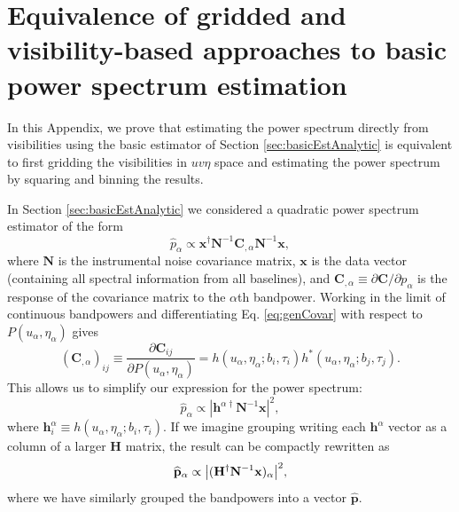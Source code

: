 \documentclass[twocolumn,aps,prd,nofootinbib,showpacs]{revtex4-1}
\begin{document}
\section{Equivalence of gridded and visibility-based approaches to basic power spectrum estimation}
\label{appendix:GridVsVisEquiv}

In this Appendix, we prove that estimating the power spectrum directly from visibilities using the basic estimator of Section \ref{sec:basicEstAnalytic} is equivalent to first gridding the visibilities in $uv\eta$ space and estimating the power spectrum by squaring and binning the results.

In Section \ref{sec:basicEstAnalytic} we considered a quadratic power spectrum estimator of the form
\begin{equation}
\widehat{p}_\alpha \propto \mathbf{x}^\dagger \mathbf{N}^{-1} \mathbf{C}_{,\alpha} \mathbf{N}^{-1} \mathbf{x},
\end{equation}
where $\mathbf{N}$ is the instrumental noise covariance matrix, $\mathbf{x}$ is the data vector (containing all spectral information from all baselines), and $\mathbf{C}_{,\alpha} \equiv \partial \mathbf{C} / \partial p_\alpha$ is the response of the covariance matrix to the $\alpha$th bandpower.  Working in the limit of continuous bandpowers and differentiating  Eq. \eqref{eq:genCovar} with respect to $P(u_\alpha, \eta_\alpha)$ gives
\begin{equation}
(\mathbf{C}_{,\alpha})_{ij} \equiv \frac{\partial \mathbf{C}_{ij}}{\partial P(u_\alpha, \eta_\alpha)} = h(u_\alpha, \eta_\alpha; b_i, \tau_i) h^* (u_\alpha, \eta_\alpha; b_j, \tau_j).
\end{equation}
This allows us to simplify our expression for the power spectrum:
\begin{equation}
\widehat{p}_\alpha \propto | \mathbf{h}^{\alpha \dagger} \mathbf{N}^{-1} \mathbf{x} |^2,
\end{equation}
where $\mathbf{h}^\alpha_i \equiv h(u_\alpha, \eta_\alpha; b_i, \tau_i )$.  If we imagine grouping writing each $\mathbf{h}^\alpha$ vector as a column of a larger $\mathbf{H}$ matrix, the result can be compactly rewritten as
\begin{equation}
\label{eq:SqEst1}
\widehat{\mathbf{p}}_\alpha \propto \big{|} (\mathbf{H}^{\dagger} \mathbf{N}^{-1} \mathbf{x})_\alpha \big{|}^2,
\end{equation}
where we have similarly grouped the bandpowers into a vector $\widehat{\mathbf{p}}$.
\end{document}
